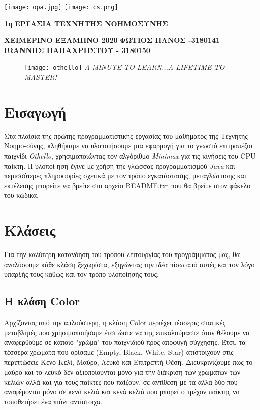 \documentclass[12pt]{article}
\begin{document}
\begin{titlepage}
    \centering
    \texttt{[image: opa.jpg]}
    \texttt{[image: cs.png]}
    \vskip3cm
    \begin{center}
        {\bfseries\Large
        1η ΕΡΓΑΣΙΑ ΤΕΧΝΗΤΗΣ ΝΟΗΜΟΣΥΝΗΣ}   
    \end{center}
    
    {\bfseries\large   
        ΧΕΙΜΕΡΙΝΟ ΕΞΑΜΗΝΟ 2020}
    \vskip5cm
    {\bfseries   
        ΦΩΤΙΟΣ ΠΑΝΟΣ -3180141\\
        ΙΩΑΝΝΗΣ ΠΑΠΑΧΡΗΣΤΟΥ - 3180150}
    \vfill
    \vfill
\end{titlepage}

\begin{figure}[H]
    \centering
    \vskip7cm
    \texttt{[image: othello]}
    \vskip1cm
    \textit{A MINUTE TO LEARN...A LIFETIME TO MASTER!}
\end{figure}

\pagebreak
\renewcommand{\contentsname}{Περιεχόμενα}
\tableofcontents
\newpage

\section{Εισαγωγή}
Στα πλαίσια της πρώτης προγραμματιστικής εργασίας του μαθήματος της Τεχνητής Νοημο-σύνης,  κληθήκαμε  να  υλοποιήσουμε μια εφαρμογή για το γνωστό επιτραπέζιο παιχνίδι \textit{ Othello\textregistered }, χρησιμοποιώντας τον αλγόριθμο \textit{Minimax} για τις κινήσεις του CPU παίκτη. Η υλοποί-ηση έγινε με χρήση της γλώσσας προγραμματισμού \textit{Java} και περισσότερες πληροφορίες σχετικά με τον τρόπο εγκατάστασης, μεταγλώττισης και εκτέλεσης μπορείτε να βρείτε στο αρχείο README.txt που θα βρείτε στον φάκελο του κώδικα. 

\section{Κλάσεις}
Για την καλύτερη κατανόηση του τρόπου λειτουργίας του προγράμματος μας, θα αναλύσουμε κάθε κλάση ξεχωρίστα, εξηγώντας την ιδέα πίσω από αυτές και τον λόγο ύπαρξής τους καθώς και τον τρόπο υλοποίησής τους. 
    \subsection{Η κλάση Color}
     Αρχίζοντας από την απλούστερη, η κλάση Color περιέχει τέσσερις στατικές μεταβλητές που χρησιμοποιήσαμε έτσι ώστε να της επικαλούμαστε όταν θέλουμε να αναφερθούμε σε κάποιο "χρώμα" του παιχνιδιού προς αποφυγή σύγχησης. Έτσι, τα τέσσερα χρώματα που ορίσαμε (Empty, Black, White, Star) ατιστοιχούν στις περιπτώσεις Κενό Κελί, Μαύρο, Λευκό και Επιτρεπτή Θέση. Διευκρινίζουμε πως το μαύρο και το λευκό δεν αξιοποιούνται μόνο για την διάκριση των χρωμάτων των κελιών αλλά και για τους παίκτες που παίζουν, σε αντίθεση με τα άλλα δύο που αναφέρονται μόνο σε κενά κελιά και κενά κελιά που μπορεί ο τρέχον παίκτης να τοποθετήσει ένα πιόνι αντίστοιχα. 
\end{document}
